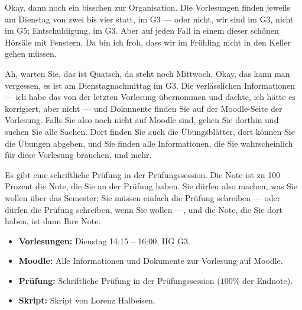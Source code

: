 \begin{spoken-clean}[00:03:15 - 00:05:10]
Okay, dann noch ein bisschen zur Organisation. Die Vorlesungen finden jeweils am Dienstag von zwei bis vier statt, im G3 --- oder nicht, wir sind im G3, nicht im G5; Entschuldigung, im G3. Aber auf jeden Fall in einem dieser schönen Hörsäle mit Fenstern. Da bin ich froh, dass wir im Frühling nicht in den Keller gehen müssen.

Ah, warten Sie, das ist Quatsch, da steht noch Mittwoch. Okay, das kann man vergessen, es ist am Dienstagnachmittag im G3. Die verlässlichen Informationen --- ich habe das von der letzten Vorlesung übernommen und dachte, ich hätte es korrigiert, aber nicht --- und Dokumente finden Sie auf der Moodle-Seite der Vorlesung. Falls Sie also noch nicht auf Moodle sind, gehen Sie dorthin und suchen Sie alle Sachen. Dort finden Sie auch die Übungsblätter, dort können Sie die Übungen abgeben, und Sie finden alle Informationen, die Sie wahrscheinlich für diese Vorlesung brauchen, und mehr.

Es gibt eine schriftliche Prüfung in der Prüfungssession. Die Note ist zu 100 Prozent die Note, die Sie an der Prüfung haben. Sie dürfen also machen, was Sie wollen über das Semester; Sie müssen einfach die Prüfung schreiben --- oder dürfen die Prüfung schreiben, wenn Sie wollen ---, und die Note, die Sie dort haben, ist dann Ihre Note.
\end{spoken-clean}

\begin{math-stroke}
\begin{itemize}
    \item \textbf{Vorlesungen:} Dienstag 14:15 -- 16:00, HG G3.
    \item \textbf{Moodle:} Alle Informationen und Dokumente zur Vorlesung auf Moodle.
    \item \textbf{Prüfung:} Schriftliche Prüfung in der Prüfungssession ($100$\% der Endnote).
    \item \textbf{Skript:} Skript von Lorenz Halbeisen.
\end{itemize}
\end{math-stroke}

